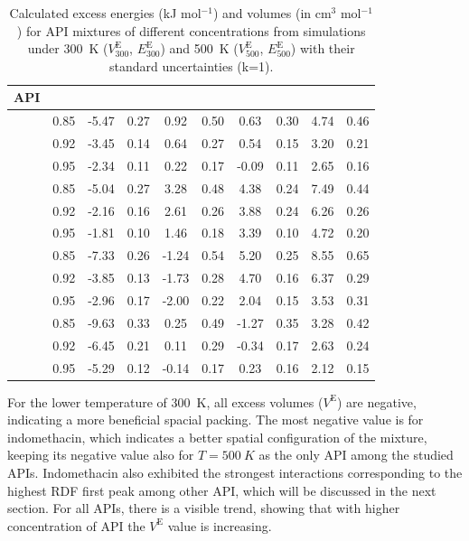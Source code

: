 \begin{table}[htb]
	\caption{Calculated excess energies (kJ mol$^{-1}$) and volumes (in cm$^3$ mol$^{-1}$) for API mixtures of different concentrations from simulations under 300~K ($V_{300}^\text{E}$, $E_{300}^\text{E}$) and 500~K ($V_{500}^\text{E}$, $E_{500}^\text{E}$) with their standard uncertainties (k=1).}
	\vspace{-0.2cm}
	\centering
	\begin{tabular}{lSSSSSSSSS}
	\toprule
	\textbf{API} &  &  &  &  &  &  &  &  &  \\
	\midrule
		 & 0.85 & -5.47 & 0.27 & 0.92 & 0.50 & 0.63 & 0.30 & 4.74 & 0.46 \\
		& 0.92 & -3.45 & 0.14 & 0.64 & 0.27 & 0.54 & 0.15 & 3.20 & 0.21 \\
		& 0.95 & -2.34 & 0.11 & 0.22 & 0.17 & -0.09 & 0.11 & 2.65 & 0.16 \\
		\midrule
		 & 0.85 & -5.04 & 0.27 & 3.28 & 0.48 & 4.38 & 0.24 & 7.49 & 0.44 \\
		& 0.92 & -2.16 & 0.16 & 2.61 & 0.26 & 3.88 & 0.24 & 6.26 & 0.26 \\
		& 0.95 & -1.81 & 0.10 & 1.46 & 0.18 & 3.39 & 0.10 & 4.72 & 0.20 \\
		\midrule
		 & 0.85 & -7.33 & 0.26 & -1.24 & 0.54 & 5.20 & 0.25 & 8.55 & 0.65 \\
		& 0.92 & -3.85 & 0.13 & -1.73 & 0.28 & 4.70 & 0.16 & 6.37 & 0.29 \\
		& 0.95 & -2.96 & 0.17 & -2.00 & 0.22 & 2.04 & 0.15 & 3.53 & 0.31 \\
		\midrule
		 & 0.85 & -9.63 & 0.33 & 0.25 & 0.49 & -1.27 & 0.35 & 3.28 & 0.42 \\
		& 0.92 & -6.45 & 0.21 & 0.11 & 0.29 & -0.34 & 0.17 & 2.63 & 0.24 \\
		& 0.95 & -5.29 & 0.12 & -0.14 & 0.17 & 0.23 & 0.16 & 2.12 & 0.15 \\
	\bottomrule
	\end{tabular}
	\label{tab:vobjemy} 
	\vspace{-0.5cm}
\end{table}

For the lower temperature of 300~K, all excess volumes ($V^\text{E}$) are negative, indicating a more beneficial spacial packing. The most negative value is for indomethacin, which indicates a better spatial configuration of the mixture, keeping its negative value also for $T=500~K$  as the only API among the studied APIs. Indomethacin also exhibited the strongest interactions corresponding to the highest RDF first peak among other API, which will be discussed in the next section. For all APIs, there is a visible trend, showing that with higher concentration of API the $V^\text{E}$ value is increasing. 

